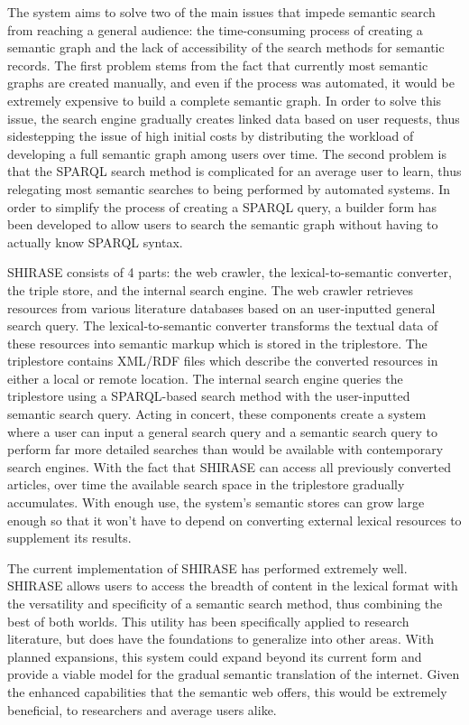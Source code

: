 \documentclass[12pt]{article}
\begin{document}
	The system aims to solve two of the main issues that impede semantic search from reaching a general audience: the time-consuming process of creating a semantic graph and the lack of accessibility of the search methods for semantic records. The first problem stems from the fact that currently most semantic graphs are created manually, and even if the process was automated, it would be extremely expensive to build a complete semantic graph. In order to solve this issue, the search engine gradually creates linked data based on user requests, thus sidestepping the issue of high initial costs by distributing the workload of developing a full semantic graph among users over time. The second problem is that the SPARQL search method is complicated for an average user to learn, thus relegating most semantic searches to being performed by automated systems. In order to simplify the process of creating a SPARQL query, a builder form has been developed to allow users to search the semantic graph without having to actually know SPARQL syntax. 
	
	SHIRASE consists of 4 parts: the web crawler, the lexical-to-semantic converter, the triple store, and the internal search engine. The web crawler retrieves resources from various literature databases based on an user-inputted general search query. The lexical-to-semantic converter transforms the textual data of these resources into semantic markup which is stored in the triplestore. The triplestore contains XML/RDF files which describe the converted resources in either a local or remote location. The internal search engine queries the triplestore using a SPARQL-based search method with the user-inputted semantic search query. Acting in concert, these components create a system where a user can input a general search query and a semantic search query to perform far more detailed searches than would be available with contemporary search engines. With the fact that SHIRASE can access all previously converted articles, over time the available search space in the triplestore gradually accumulates. With enough use, the system’s semantic stores can grow large enough so that it won’t have to depend on converting external lexical resources to supplement its results.
	
	The current implementation of SHIRASE has performed extremely well. SHIRASE allows users to  access the breadth of content in the lexical format with the versatility and specificity of a semantic search method, thus combining the best of both worlds. This utility has been specifically applied to research literature, but does have the foundations to generalize into other areas.  With planned expansions, this system could expand beyond its current form and provide a viable model for the gradual semantic translation of the internet. Given the enhanced capabilities that the semantic web offers, this would be extremely beneficial, to researchers and average users alike.
	\printbibliography
\end{document}
